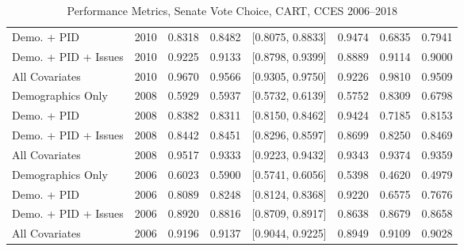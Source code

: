 \begin{table}[ht]
\begin{tabular}{lrrrlrrr}
  Demo. + PID & 2010 & 0.8318 & 0.8482 & [0.8075, 0.8833] & 0.9474 & 0.6835 & 0.7941 \\ 
  Demo. + PID + Issues & 2010 & 0.9225 & 0.9133 & [0.8798, 0.9399] & 0.8889 & 0.9114 & 0.9000 \\ 
  All Covariates & 2010 & 0.9670 & 0.9566 & [0.9305, 0.9750] & 0.9226 & 0.9810 & 0.9509 \\ 
  Demographics Only & 2008 & 0.5929 & 0.5937 & [0.5732, 0.6139] & 0.5752 & 0.8309 & 0.6798 \\ 
  Demo. + PID & 2008 & 0.8382 & 0.8311 & [0.8150, 0.8462] & 0.9424 & 0.7185 & 0.8153 \\ 
  Demo. + PID + Issues & 2008 & 0.8442 & 0.8451 & [0.8296, 0.8597] & 0.8699 & 0.8250 & 0.8469 \\ 
  All Covariates & 2008 & 0.9517 & 0.9333 & [0.9223, 0.9432] & 0.9343 & 0.9374 & 0.9359 \\ 
  Demographics Only & 2006 & 0.6023 & 0.5900 & [0.5741, 0.6056] & 0.5398 & 0.4620 & 0.4979 \\ 
  Demo. + PID & 2006 & 0.8089 & 0.8248 & [0.8124, 0.8368] & 0.9220 & 0.6575 & 0.7676 \\ 
  Demo. + PID + Issues & 2006 & 0.8920 & 0.8816 & [0.8709, 0.8917] & 0.8638 & 0.8679 & 0.8658 \\ 
  All Covariates & 2006 & 0.9196 & 0.9137 & [0.9044, 0.9225] & 0.8949 & 0.9109 & 0.9028 \\ 
   \bottomrule
\end{tabular}
\caption{Performance Metrics, Senate Vote Choice, CART, CCES 2006--2018} 
\label{tab:cces_senate_cart}
\end{table}
